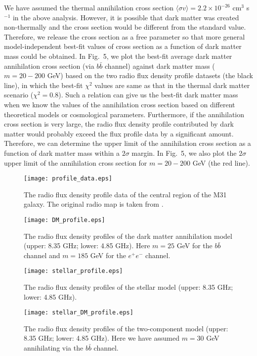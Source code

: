 \documentclass[useAMS,usenatbib]{mn2e}
\begin{document}
We have assumed the thermal annihilation cross section $\langle \sigma v \rangle=2.2 \times 10^{-26}$ cm$^3$ s$^{-1}$ in the above analysis. However, it is possible that dark matter was created non-thermally and the cross section would be different from the standard value. Therefore, we release the cross section as a free parameter so that more general model-independent best-fit values of cross section as a function of dark matter mass could be obtained. In Fig.~5, we plot the best-fit average dark matter annihilation cross section (via $b\bar{b}$ channel) against dark matter mass ($m=20-200$ GeV) based on the two radio flux density profile datasets (the black line), in which the best-fit $\chi^2$ values are same as that in the thermal dark matter scenario ($\chi^2=0.8$). Such a relation can give us the best-fit dark matter mass when we know the values of the annihilation cross section based on different theoretical models or cosmological parameters. Furthermore, if the annihilation cross section is very large, the radio flux density profile contributed by dark matter would probably exceed the flux profile data by a significant amount. Therefore, we can determine the upper limit of the annihilation cross section as a function of dark matter mass within a $2\sigma$ margin. In Fig.~5, we also plot the $2\sigma$ upper limit of the annihilation cross section for $m=20-200$ GeV (the red line).

\begin{figure}
\vskip 10mm
 \texttt{[image: profile\_data.eps]}
 \caption{The radio flux density profile data of the central region of the M31 galaxy. The original radio map is taken from \citet{Giebubel}.}
\vskip 10mm
\end{figure}

\begin{figure}
\vskip 10mm
 \texttt{[image: DM\_profile.eps]}
 \caption{The radio flux density profiles of the dark matter annihilation model (upper: 8.35 GHz; lower: 4.85 GHz). Here $m=25$ GeV for the $b\bar{b}$ channel and $m=185$ GeV for the $e^+e^-$ channel.}
\vskip 10mm
\end{figure}

\begin{figure}
\vskip 10mm
 \texttt{[image: stellar\_profile.eps]}
 \caption{The radio flux density profiles of the stellar model (upper: 8.35 GHz; lower: 4.85 GHz).}
\vskip 10mm
\end{figure}

\begin{figure}
\vskip 10mm
 \texttt{[image: stellar\_DM\_profile.eps]}
 \caption{The radio flux density profiles of the two-component model (upper: 8.35 GHz; lower: 4.85 GHz). Here we have assumed $m=30$ GeV annihilating via the $b\bar{b}$ channel.}
\vskip 10mm
\end{figure}
\end{document}
